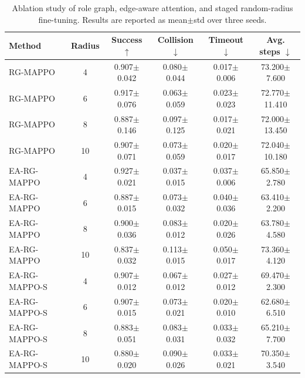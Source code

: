 \begin{table}[t]
\centering
\caption{Ablation study of role graph, edge-aware attention, and staged random-radius fine-tuning. Results are reported as mean$\pm$std over three seeds.}
\label{tab:ablation_results}
\begin{tabular}{lccccc}
\toprule
Method & Radius & Success $\uparrow$ & Collision $\downarrow$ & Timeout $\downarrow$ & Avg. steps $\downarrow$ \\
\midrule
RG-MAPPO & 4 & 0.907$\pm$0.042 & 0.080$\pm$0.044 & 0.017$\pm$0.006 & 73.200$\pm$7.600 \\
RG-MAPPO & 6 & 0.917$\pm$0.076 & 0.063$\pm$0.059 & 0.023$\pm$0.023 & 72.770$\pm$11.410 \\
RG-MAPPO & 8 & 0.887$\pm$0.146 & 0.097$\pm$0.125 & 0.017$\pm$0.021 & 72.000$\pm$13.450 \\
RG-MAPPO & 10 & 0.907$\pm$0.071 & 0.073$\pm$0.059 & 0.020$\pm$0.017 & 72.040$\pm$10.180 \\
\midrule
EA-RG-MAPPO & 4 & 0.927$\pm$0.021 & 0.037$\pm$0.015 & 0.037$\pm$0.006 & 65.850$\pm$2.780 \\
EA-RG-MAPPO & 6 & 0.887$\pm$0.015 & 0.073$\pm$0.032 & 0.040$\pm$0.036 & 63.410$\pm$2.200 \\
EA-RG-MAPPO & 8 & 0.900$\pm$0.036 & 0.083$\pm$0.012 & 0.020$\pm$0.026 & 63.780$\pm$4.580 \\
EA-RG-MAPPO & 10 & 0.837$\pm$0.032 & 0.113$\pm$0.015 & 0.050$\pm$0.017 & 73.360$\pm$4.120 \\
\midrule
EA-RG-MAPPO-S & 4 & 0.907$\pm$0.012 & 0.067$\pm$0.012 & 0.027$\pm$0.012 & 69.470$\pm$2.300 \\
EA-RG-MAPPO-S & 6 & 0.907$\pm$0.015 & 0.073$\pm$0.021 & 0.020$\pm$0.010 & 62.680$\pm$6.510 \\
EA-RG-MAPPO-S & 8 & 0.883$\pm$0.051 & 0.083$\pm$0.031 & 0.033$\pm$0.032 & 65.210$\pm$7.700 \\
EA-RG-MAPPO-S & 10 & 0.880$\pm$0.020 & 0.090$\pm$0.026 & 0.033$\pm$0.021 & 70.350$\pm$3.540 \\
\bottomrule
\end{tabular}
\end{table}
